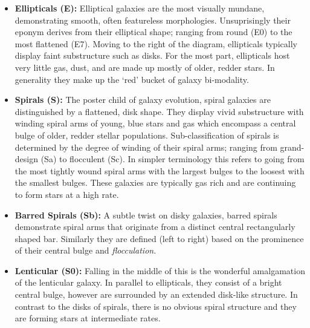 \begin{itemize}
    \item \textbf{Ellipticals (E):} Elliptical galaxies are the most visually mundane, demonstrating smooth, often featureless morphologies. Unsuprisingly their eponym derives from their elliptical shape; ranging from round (E0) to the most flattened (E7). Moving to the right of the diagram, ellipticals typically display faint substructure such as disks. For the most part, ellipticals host very little gas, dust, and are made up mostly of older, redder stars. In generality they make up the `red' bucket of galaxy bi-modality.
    
    \item \textbf{Spirals (S):} The poster child of galaxy evolution, spiral galaxies are distinguished by a flattened, disk shape. They display vivid substructure with winding spiral arms of young, blue stars and gas which encompass a central bulge of older, redder stellar populations. Sub-classification of spirals is determined by the degree of winding of their spiral arms; ranging from grand-design (Sa) to flocculent (Sc). In simpler terminology this refers to going from the most tightly wound spiral arms with the largest bulges to the loosest with the smallest bulges. These galaxies are typically gas rich and are continuing to form stars at a high rate. 
    
    \item \textbf{Barred Spirals (Sb):} A subtle twist on disky galaxies, barred spirals demonstrate spiral arms that originate from a distinct central rectangularly shaped bar. Similarly they are defined (left to right) based on the prominence of their central bulge and \textit{flocculation}.
    
    \item \textbf{Lenticular (S0):} Falling in the middle of this is the wonderful amalgamation of the lenticular galaxy. In parallel to ellipticals, they consist of a bright central bulge, however are surrounded by an extended disk-like structure. In contrast to the disks of spirals, there is no obvious spiral structure and they are forming stars at intermediate rates.
\end{itemize}

